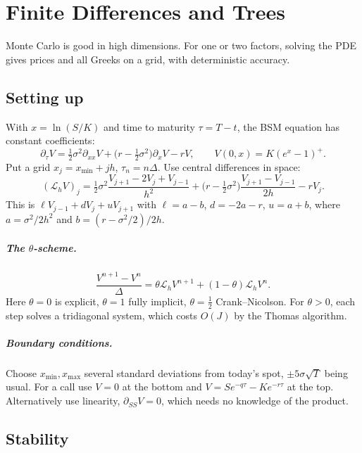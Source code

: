 \chapter{Finite Differences and Trees}\label{ch:pde}

Monte Carlo is good in high dimensions. For one or two factors, solving the PDE gives prices and all Greeks on a grid, with deterministic accuracy.

\section{Setting up}

With $x=\ln(S/K)$ and time to maturity $\tau=T-t$, the BSM equation has constant coefficients:
\begin{equation}\label{eq:bslog}
\partial_\tau V=\tfrac12\sigma^2\partial_{xx}V+\bigl(r-\tfrac12\sigma^2\bigr)\partial_xV-rV,\qquad V(0,x)=K(e^x-1)^+.
\end{equation}
Put a grid $x_j=x_{\min}+jh$, $\tau_n=n\Delta$. Use central differences in space:
\[
(\mathcal{L}_hV)_j=\tfrac12\sigma^2\frac{V_{j+1}-2V_j+V_{j-1}}{h^2}+\bigl(r-\tfrac12\sigma^2\bigr)\frac{V_{j+1}-V_{j-1}}{2h}-rV_j.
\]
This is $\ell V_{j-1}+dV_j+uV_{j+1}$ with $\ell=a-b$, $d=-2a-r$, $u=a+b$, where $a=\sigma^2/2h^2$ and $b=(r-\sigma^2/2)/2h$.

\paragraph{The $\theta$-scheme.}
\[
\frac{V^{n+1}-V^n}{\Delta}=\theta\mathcal{L}_hV^{n+1}+(1-\theta)\mathcal{L}_hV^n.
\]
Here $\theta=0$ is explicit, $\theta=1$ fully implicit, $\theta=\tfrac12$ Crank--Nicolson. For $\theta>0$, each step solves a tridiagonal system, which costs $O(J)$ by the Thomas algorithm.

\paragraph{Boundary conditions.} Choose $x_{\min},x_{\max}$ several standard deviations from today's spot, $\pm5\sigma\sqrt T$ being usual. For a call use $V=0$ at the bottom and $V=Se^{-q\tau}-Ke^{-r\tau}$ at the top. Alternatively use linearity, $\partial_{SS}V=0$, which needs no knowledge of the product.

\section{Stability}

